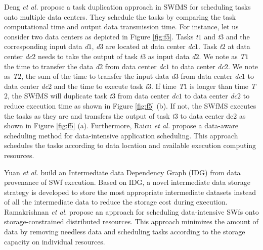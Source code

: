 Deng \textit{et al.} \cite{Deng2011} propose a task duplication approach
in SWfMS for scheduling tasks onto multiple data centers. They schedule
the tasks by comparing the task computational time and output data
transmission time. For instance, let us consider two data centers
as depicted in Figure \ref{fig:f5}. Tasks \textit{t}\textit{\tiny{$1$}}
and \textit{t}\textit{\tiny{$3$}} and the corresponding input data \textit{d}\textit{\tiny{$1$}},
\textit{d}\textit{\tiny{$3$}} are located at data center \textit{dc}\textit{\tiny{$1$}}.
Task \textit{t}\textit{\tiny{$2$}} at data center \textit{dc}\textit{\tiny{$2$}}
needs to take the output of task \textit{t}\textit{\tiny{$3$}} as input
data \textit{d}\textit{\tiny{$2$}}. We note as \textit{T}\textit{\tiny{$1$}}
the time to transfer the data \textit{d}\textit{\tiny{$2$}} from data
center \textit{dc}\textit{\tiny{$1$}} to data center \textit{dc}\textit{\tiny{$2$}}.
We note as \textit{T}\textit{\tiny{$2$}}, the sum of the time to transfer
the input data \textit{d}\textit{\tiny{$3$}} from data center \textit{dc}\textit{\tiny{$1$}}
to data center \textit{dc}\textit{\tiny{$2$}} and the time to execute
task \textit{t}\textit{\tiny{$3$}}. If time \textit{T}\textit{\tiny{$1$}}
is longer than time \textit{T}\textit{\tiny{$2$}}, the SWfMS will duplicate
task \textit{t}\textit{\tiny{$3$}} from data center \textit{dc}\textit{\tiny{$1$}}
to data center \textit{dc}\textit{\tiny{$2$}} to reduce execution time
as shown in Figure \ref{fig:f5} (b). If not, the SWfMS executes the
tasks as they are and transfers the output of task \textit{t}\textit{\tiny{$3$}}
to data center dc{\tiny{$2$}} as shown in Figure \ref{fig:f5} (a).
Furthermore, Raicu \textit{et al.} \cite{Raicu2008} propose a data-aware
scheduling method for data-intensive application scheduling. This
approach schedules the tasks according to data location and available
execution computing resources.

Yuan \textit{et al.} \cite{Yuan2010} build an Intermediate data Dependency
Graph (IDG) from data provenance of SWf execution. Based on
IDG, a novel intermediate data storage strategy is developed to store
the most appropriate intermediate datasets instead of all the intermediate
data to reduce the storage cost during execution. Ramakrishnan \textit{et
al.} \cite{Ramakrishnan2007} propose an approach for scheduling data-intensive
SWfs onto storage-constrained distributed resources. This approach
minimizes the amount of data by removing needless data and scheduling
tasks according to the storage capacity on individual resources. 


